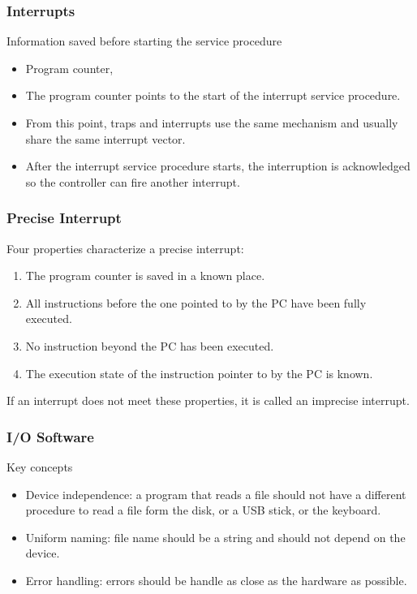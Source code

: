 \begin{frame}
  \frametitle{Interrupts}
  \begin{block}{Information saved before starting the service procedure}
    \begin{itemize}
      \item Program counter,
      \item The program counter points to the start of the interrupt service procedure.
      \item From this point, traps and interrupts use the same mechanism and usually share the same interrupt vector.
      \item After the interrupt service procedure starts, the interruption is acknowledged so the controller can fire another interrupt.
    \end{itemize}
  \end{block}
\end{frame}

\begin{frame}
  \frametitle{Precise Interrupt}
  Four properties characterize a precise interrupt:
  \begin{enumerate}
    \item The program counter is saved in a known place.
    \item All instructions before the one pointed to by the PC have been fully executed.
    \item No instruction beyond the PC has been executed.
    \item The execution state of the instruction pointer to by the PC is known.
  \end{enumerate}
  If an interrupt does not meet these properties, it is called an imprecise interrupt.
\end{frame}

\begin{frame}
  \frametitle{I/O Software}
  \begin{block}{Key concepts}
    \begin{itemize}
      \item Device independence: a program that reads a file should not have a different procedure to read a file form the disk, or a USB stick, or the keyboard.
      \item Uniform naming: file name should be a string and should not depend on the device.
      \item Error handling: errors should be handle as close as the hardware as possible.
    \end{itemize}
  \end{block}
\end{frame}

